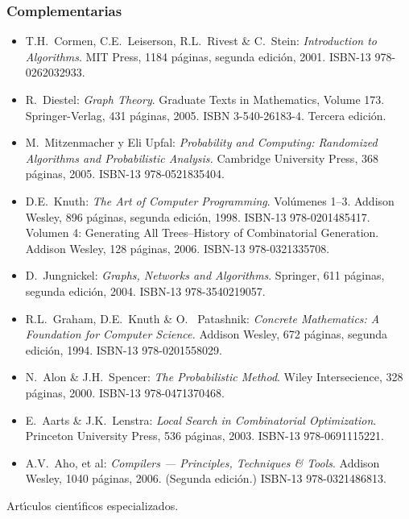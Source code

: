 \documentclass[10 pt]{article}
\begin{document}
\subsubsection{Complementarias}

\begin{itemize}[itemsep=0em]
  
\item T.H.\ {\sc Cormen}, C.E.\ {\sc Leiserson}, R.L.\ Rivest \&
  C.\ {\sc Stein}: {\em Introduction to Algorithms}. MIT Press,
  1184 p\'{a}ginas, segunda edici\'{o}n, 2001. ISBN-13
  978-0262032933.
  
\item R.\ {\sc Diestel}: {\em Graph Theory}. Graduate Texts in
  Mathematics, Volume 173. Springer-Verlag, 431 p\'{a}ginas,
  2005. ISBN 3-540-26183-4. Tercera edici\'{o}n.
  
\item M.\ {\sc Mitzenmacher} y Eli {\sc Upfal}: {\em
    Probability and Computing: Randomized Algorithms and
    Probabilistic Analysis.}  Cambridge University Press, 368
  p\'{a}ginas, 2005. ISBN-13 978-0521835404.
  
\item D.E.\ {\sc Knuth}: {\em The Art of Computer
    Programming}. Vol\'{u}menes 1--3. Addison Wesley, 896
  p\'{a}ginas, segunda edici\'{o}n, 1998. ISBN-13
  978-0201485417. Volumen 4: Generating All Trees--History of
  Combinatorial Generation. Addison Wesley, 128 p\'{a}ginas,
  2006. ISBN-13 978-0321335708.
  
\item D.\ {\sc Jungnickel}: {\em Graphs, Networks and
    Algorithms}. Springer, 611 p\'{a}ginas, segunda edici\'{o}n,
  2004. ISBN-13 978-3540219057.
  
\item R.L.\ {\sc Graham}, D.E.\ {\sc Knuth} \& O.\ {\sc
    Patashnik}: {\em Concrete Mathematics: A Foundation for
    Computer
    Science.} Addison Wesley, 672 p\'{a}ginas, segunda edici\'{o}n,
  1994. ISBN-13 978-0201558029.
  
\item N.\ {\sc Alon} \& J.H.\ {\sc Spencer}: {\em The
    Probabilistic Method}. Wiley Intersecience, 328 p\'{a}ginas,
  2000. ISBN-13 978-0471370468.
  
\item E.\ {\sc Aarts} \& J.K.\ {\sc Lenstra}: {\em Local
    Search
    in Combinatorial Optimization}. Princeton University
  Press, 536
  p\'{a}ginas, 2003. ISBN-13 978-0691115221.
  
\item A.V.\ {\sc Aho}, et al: {\em Compilers ---
    Principles,
    Techniques \& Tools}. Addison Wesley, 1040
  p\'{a}ginas, 2006. (Segunda
  edici\'{o}n.) ISBN-13 978-0321486813.
  
\end{itemize}
 
Art\'{\i}culos cient\'{\i}ficos especializados.

\label{final} %


\end{document}
